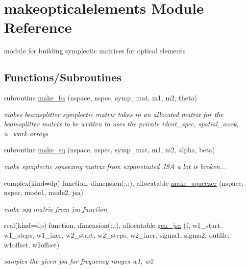 \hypertarget{namespacemakeopticalelements}{}\section{makeopticalelements Module Reference}
\label{namespacemakeopticalelements}


module for building symplectic matrices for optical elements  


\subsection*{Functions/\+Subroutines}
\begin{DoxyCompactItemize}
\item 
subroutine \hyperlink{namespacemakeopticalelements_a593a6ee34afdeebc8b4667791c8a144f}{make\+\_\+bs} (nspace, nspec, symp\+\_\+mat, m1, m2, theta)
\begin{DoxyCompactList}\small\item\em makes beamsplitter symplectic matrix  takes in an allocated matrix for the beamsplitter matrix to be written to uses the private ident\+\_\+spec, spatial\+\_\+work, n\+\_\+work arrays \end{DoxyCompactList}\item 
subroutine \hyperlink{namespacemakeopticalelements_a6658c2ce879c0bc4b2e5918064a6a308}{make\+\_\+sq} (nspace, nspec, symp\+\_\+mat, m1, m2, alpha, beta)
\begin{DoxyCompactList}\small\item\em make symplectic squeezing matrix from exponetiated J\+SA  a lot is broken... \end{DoxyCompactList}\item 
complex(kind=dp) function, dimension(\+:,\+:), allocatable \hyperlink{namespacemakeopticalelements_ae72bdfe443e711e230a7bf9c19d827d4}{make\+\_\+squeezer} (nspace, nspec, mode1, mode2, jsa)
\begin{DoxyCompactList}\small\item\em make sqq matrix from jsa function \end{DoxyCompactList}\item 
real(kind=dp) function, dimension(\+:,\+:), allocatable \hyperlink{namespacemakeopticalelements_a230fa3e5fad58bf78ec6aecff5747ca6}{gen\+\_\+jsa} (f, w1\+\_\+start, w1\+\_\+steps, w1\+\_\+incr, w2\+\_\+start, w2\+\_\+steps, w2\+\_\+incr, sigma1, sigma2, outfile, w1offset, w2offset)
\begin{DoxyCompactList}\small\item\em samples the given jsa for frequency ranges w1, w2 \end{DoxyCompactList}\item 

\end{DoxyCompactItemize}
